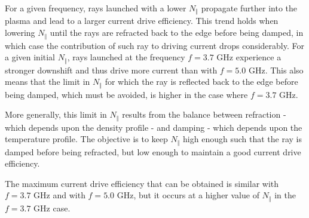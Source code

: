 \documentclass[a4paper,12pt]{article}%
\begin{document}
For a given frequency, rays launched with a lower $N_{\Vert}$ propagate
further into the plasma and lead to a larger current drive efficiency. This
trend holds when lowering $N_{\Vert}$ until the rays are refracted back to the
edge before being damped, in which case the contribution of such ray to
driving current drops considerably. For a given initial $N_{\Vert}$, rays
launched at the frequency $f=3.7$ GHz experience a stronger downshift and thus
drive more current than with $f=5.0$ GHz. This also means that the limit in
$N_{\Vert}$ for which the ray is reflected back to the edge before being
damped, which must be avoided, is higher in the case where $f=3.7$ GHz.

More generally, this limit in $N_{\Vert}$ results from the balance between
refraction - which depends upon the density profile - and damping - which
depends upon the temperature profile. The objective is to keep $N_{\Vert}$
high enough such that the ray is damped before being refracted, but low enough
to maintain a good current drive efficiency.

The maximum current drive efficiency that can be obtained is similar with
$f=3.7$ GHz and with $f=5.0$ GHz, but it occurs at a higher value of
$N_{\Vert}$ in the $f=3.7$ GHz case.%
\end{document}
